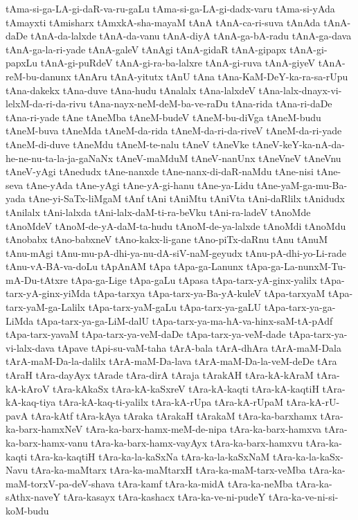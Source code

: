 {tAma-si-ga-LA-gi-daR-va-ru-gaLu
tAma-si-ga-LA-gi-dadx-varu
tAma-si-yAda
tAmayxti
tAmisharx
tAmxkA-sha-mayaM
tAnA
tAnA-ca-ri-suva
tAnAda
tAnA-daDe
tAnA-da-lalxde
tAnA-da-vanu
tAnA-diyA
tAnA-ga-bA-radu
tAnA-ga-dava
tAnA-ga-la-ri-yade
tAnA-galeV
tAnAgi
tAnA-gidaR
tAnA-gipapx
tAnA-gi-papxLu
tAnA-gi-puRdeV
tAnA-gi-ra-ba-lalxre
tAnA-gi-ruva
tAnA-giyeV
tAnA-reM-bu-danunx
tAnAru
tAnA-yitutx
tAnU
tAna
tAna-KaM-DeY-ka-ra-sa-rUpu
tAna-dakekx
tAna-duve
tAna-hudu
tAnalalx
tAna-lalxdeV
tAna-lalx-dnayx-vi-lelxM-da-ri-da-rivu
tAna-nayx-neM-deM-ba-ve-raDu
tAna-rida
tAna-ri-daDe
tAna-ri-yade
tAne
tAneMba
tAneM-budeV
tAneM-bu-diVga
tAneM-budu
tAneM-buva
tAneMda
tAneM-da-rida
tAneM-da-ri-da-riveV
tAneM-da-ri-yade
tAneM-di-duve
tAneMdu
tAneM-te-nalu
tAneV
tAneVke
tAneV-keY-ka-nA-da-he-ne-nu-ta-la-ja-gaNaNx
tAneV-maMduM
tAneV-nanUnx
tAneVneV
tAneVnu
tAneV-yAgi
tAnedudx
tAne-nanxde
tAne-nanx-di-daR-naMdu
tAne-nisi
tAne-seva
tAne-yAda
tAne-yAgi
tAne-yA-gi-hanu
tAne-ya-Lidu
tAne-yaM-ga-mu-Ba-yada
tAne-yi-SaTx-liMgaM
tAnf
tAni
tAniMtu
tAniVta
tAni-daRlilx
tAnidudx
tAnilalx
tAni-lalxda
tAni-lalx-daM-ti-ra-beVku
tAni-ra-ladeV
tAnoMde
tAnoMdeV
tAnoM-de-yA-daM-ta-hudu
tAnoM-de-ya-lalxde
tAnoMdi
tAnoMdu
tAnobabx
tAno-babxneV
tAno-kakx-li-gane
tAno-piTx-daRnu
tAnu
tAnuM
tAnu-mAgi
tAnu-mu-pA-dhi-ya-nu-dA-siV-naM-geyudx
tAnu-pA-dhi-yo-Li-rade
tAnu-vA-BA-va-doLu
tApAnAM
tApa
tApa-ga-Lanunx
tApa-ga-La-nunxM-Tu-mA-Du-tAtxre
tApa-ga-Lige
tApa-gaLu
tApasa
tApa-tarx-yA-ginx-yalilx
tApa-tarx-yA-ginx-yiMda
tApa-tarxya
tApa-tarx-ya-Ba-yA-kuleV
tApa-tarxyaM
tApa-tarx-yaM-ga-Lalilx
tApa-tarx-yaM-gaLu
tApa-tarx-ya-gaLU
tApa-tarx-ya-ga-LiMda
tApa-tarx-ya-ga-LiM-dalU
tApa-tarx-ya-ma-hA-va-hinx-saM-tA-pAdf
tApa-tarx-yavaM
tApa-tarx-ya-veM-daDe
tApa-tarx-ya-veM-dade
tApa-tarx-ya-vi-lalx-dava
tApave
tApi-su-vaM-taha
tArA-bala
tArA-dhAra
tArA-maM-Dala
tArA-maM-Da-la-dalilx
tArA-maM-Da-lava
tArA-maM-Da-la-veM-deDe
tAra
tAraH
tAra-dayAyx
tArade
tAra-dirA
tAraja
tArakAH
tAra-kA-kAraM
tAra-kA-kAroV
tAra-kAkaSx
tAra-kA-kaSxreV
tAra-kA-kaqti
tAra-kA-kaqtiH
tAra-kA-kaq-tiya
tAra-kA-kaq-ti-yalilx
tAra-kA-rUpa
tAra-kA-rUpaM
tAra-kA-rU-pavA
tAra-kAtf
tAra-kAya
tAraka
tArakaH
tArakaM
tAra-ka-barxhamx
tAra-ka-barx-hamxNeV
tAra-ka-barx-hamx-meM-de-nipa
tAra-ka-barx-hamxva
tAra-ka-barx-hamx-vanu
tAra-ka-barx-hamx-vayAyx
tAra-ka-barx-hamxvu
tAra-ka-kaqti
tAra-ka-kaqtiH
tAra-ka-la-kaSxNa
tAra-ka-la-kaSxNaM
tAra-ka-la-kaSx-Navu
tAra-ka-maMtarx
tAra-ka-maMtarxH
tAra-ka-maM-tarx-veMba
tAra-ka-maM-torxV-pa-deV-shava
tAra-kamf
tAra-ka-midA
tAra-ka-neMba
tAra-ka-sAthx-naveY
tAra-kasayx
tAra-kashacx
tAra-ka-ve-ni-pudeY
tAra-ka-ve-ni-si-koM-budu
}
